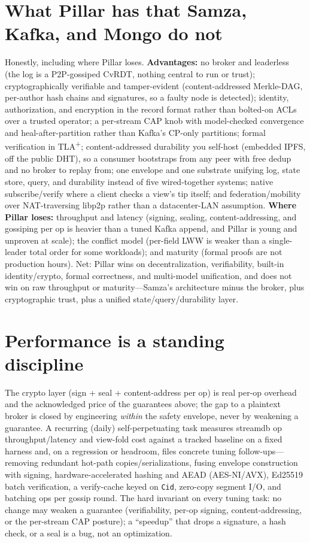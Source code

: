 \documentclass[10pt,twocolumn]{article}
\newcommand{\code}[1]{\texttt{\small #1}}
\newcommand{\Cid}{\code{Cid}}
\begin{document}
\section{What Pillar has that Samza, Kafka, and Mongo do not}
Honestly, including where Pillar loses. \textbf{Advantages:} no broker and leaderless
(the log is a P2P-gossiped CvRDT, nothing central to run or trust);
cryptographically verifiable and tamper-evident (content-addressed Merkle-DAG,
per-author hash chains and signatures, so a faulty node is detected); identity,
authorization, and encryption in the record format rather than bolted-on ACLs over a
trusted operator; a per-stream CAP knob with model-checked convergence and
heal-after-partition rather than Kafka's CP-only partitions; formal verification in
TLA\textsuperscript{+}; content-addressed durability you self-host (embedded IPFS, off
the public DHT), so a consumer bootstraps from any peer with free dedup and no broker
to replay from; one envelope and one substrate unifying log, state store, query, and
durability instead of five wired-together systems; native subscribe/verify where a
client checks a view's tip itself; and federation/mobility over NAT-traversing libp2p
rather than a datacenter-LAN assumption. \textbf{Where Pillar loses:} throughput and
latency (signing, sealing, content-addressing, and gossiping per op is heavier than a
tuned Kafka append, and Pillar is young and unproven at scale); the conflict model
(per-field LWW is weaker than a single-leader total order for some workloads); and
maturity (formal proofs are not production hours). Net: Pillar wins on
decentralization, verifiability, built-in identity/crypto, formal correctness, and
multi-model unification, and does not win on raw throughput or maturity---Samza's
architecture minus the broker, plus cryptographic trust, plus a unified
state/query/durability layer.

\section{Performance is a standing discipline}
The crypto layer (sign + seal + content-address per op) is real per-op overhead and
the acknowledged price of the guarantees above; the gap to a plaintext broker is
closed by engineering \emph{within} the safety envelope, never by weakening a
guarantee. A recurring (daily) self-perpetuating task measures streamdb op
throughput/latency and view-fold cost against a tracked baseline on a fixed harness
and, on a regression or headroom, files concrete tuning follow-ups---removing
redundant hot-path copies/serializations, fusing envelope construction with signing,
hardware-accelerated hashing and AEAD (AES-NI/AVX), Ed25519 batch verification, a
verify-cache keyed on \Cid{}, zero-copy segment I/O, and batching ops per gossip
round. The hard invariant on every tuning task: no change may weaken a guarantee
(verifiability, per-op signing, content-addressing, or the per-stream CAP posture); a
``speedup'' that drops a signature, a hash check, or a seal is a bug, not an
optimization.
\end{document}
